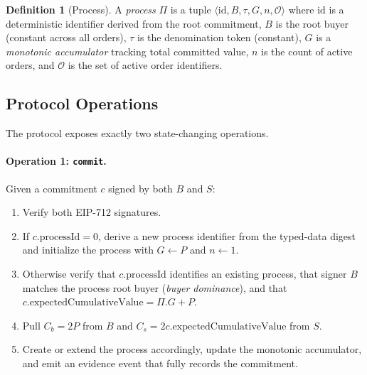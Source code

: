 \documentclass[11pt,a4paper]{article}
\theoremstyle{definition}
\newtheorem{definition}[theorem]{Definition}
\theoremstyle{remark}
\newcommand{\pay}{P}           %
\newcommand{\cumval}{G}        %
\newcommand{\sbond}{C_s}       %
\newcommand{\bbond}{C_b}       %
\begin{document}
\begin{definition}[Process]
\label{def:process}
A \emph{process} $\Pi$ is a tuple $\langle \text{id}, B, \tau, \cumval,
n, \mathcal{O} \rangle$ where $\text{id}$ is a deterministic identifier
derived from the root commitment, $B$ is the root buyer (constant across
all orders), $\tau$ is the denomination token (constant), $\cumval$ is a
\emph{monotonic accumulator} tracking total committed value, $n$ is the
count of active orders, and $\mathcal{O}$ is the set of active order
identifiers.
\end{definition}

\subsection{Protocol Operations}

The protocol exposes exactly two state-changing operations.

\paragraph{Operation 1: \texttt{commit}.}
Given a commitment $c$ signed by both $B$ and $S$:
\begin{enumerate}
  \item Verify both EIP-712 signatures.
  \item If $c.\text{processId} = 0$, derive a new process identifier from
    the typed-data digest and initialize the process with
    $\cumval \gets \pay$ and $n \gets 1$.
  \item Otherwise verify that $c.\text{processId}$ identifies an
    existing process, that signer $B$ matches the process root buyer
    (\emph{buyer dominance}), and that
    $c.\text{expectedCumulativeValue} = \Pi.\cumval + \pay$.
  \item Pull $\bbond = 2\pay$ from $B$ and
    $\sbond = 2c.\text{expectedCumulativeValue}$ from $S$.
  \item Create or extend the process accordingly, update the monotonic
    accumulator, and emit an evidence event that fully records the
    commitment.
\end{enumerate}
\end{document}
